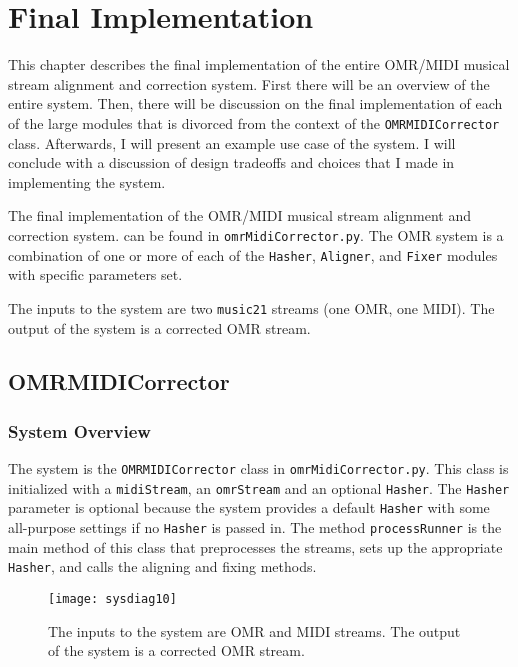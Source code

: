 \chapter{Final Implementation}
This chapter describes the final implementation of the entire OMR/MIDI musical stream alignment and correction system. First there will be an overview of the entire system. Then, there will be discussion on the final implementation of each of the large modules that is divorced from the context of the \texttt{OMRMIDICorrector} class. Afterwards, I will present an example use case of the system. I will conclude with a discussion of design tradeoffs and choices that I made in implementing the system.

The final implementation of the OMR/MIDI musical stream alignment and correction system. can be found in \texttt{omrMidiCorrector.py}. The OMR system is a combination of one or more of each of the \texttt{Hasher}, \texttt{Aligner}, and \texttt{Fixer} modules with specific parameters set. 

The inputs to the system are two \texttt{music21} streams (one OMR, one MIDI). The output of the system is a corrected OMR stream. 

\section{OMRMIDICorrector}

\subsection{System Overview}
The system is the \texttt{OMRMIDICorrector} class in \texttt{omrMidiCorrector.py}. This class is initialized with a \texttt{midiStream}, an \texttt{omrStream} and an optional \texttt{Hasher}. The \texttt{Hasher} parameter is optional because the system provides a default \texttt{Hasher} with some all-purpose settings if no \texttt{Hasher} is passed in. The method \texttt{processRunner} is the main method of this class that preprocesses the streams, sets up the appropriate \texttt{Hasher}, and calls the aligning and fixing methods.

\begin{figure}[!h]
\centering
\texttt{[image: sysdiag10]}
\caption[System diagram.] {The inputs to the system are OMR and MIDI streams. The output of the system is a corrected OMR stream.}
\end{figure}

